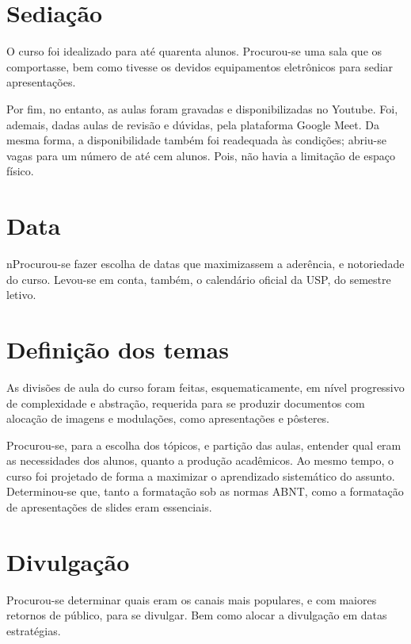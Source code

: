\documentclass[
12pt,				%
openright,			%
oneside,			%
a4paper,			%
english,			%
french,				%
spanish,			%
brazil,				%
]{abntex2}
\begin{document}
\section{Sediação}
O curso foi idealizado para até quarenta alunos. Procurou-se uma sala
que os comportasse, bem como tivesse os devidos equipamentos
eletrônicos para sediar apresentações.

Por fim, no entanto, as aulas foram gravadas e disponibilizadas no
Youtube. Foi, ademais, dadas aulas de revisão e dúvidas, pela
plataforma Google Meet. Da mesma forma, a disponibilidade também foi
readequada às condições; abriu-se vagas para um número de até cem
alunos. Pois, não havia a limitação de espaço físico.

\section{Data}
nProcurou-se fazer escolha de datas que maximizassem a aderência, e
notoriedade do curso. Levou-se em conta, também, o calendário oficial
da USP, do semestre letivo.

\section{Definição dos temas}

As divisões de aula do curso foram feitas, esquematicamente, em nível
progressivo de complexidade e abstração, requerida para se produzir
documentos com alocação de imagens e modulações, como apresentações e pôsteres.

Procurou-se, para a escolha dos tópicos, e partição das aulas,
entender qual eram as necessidades dos alunos, quanto a produção
acadêmicos. Ao mesmo tempo, o curso foi projetado de forma a maximizar o
aprendizado sistemático do assunto.  Determinou-se que, tanto a
formatação sob as normas ABNT, como a formatação de apresentações de slides eram essenciais.

\section{Divulgação}

Procurou-se determinar quais eram os canais mais populares, e com
maiores retornos de público, para se divulgar. Bem como alocar a
divulgação em datas estratégias.

\end{document}
